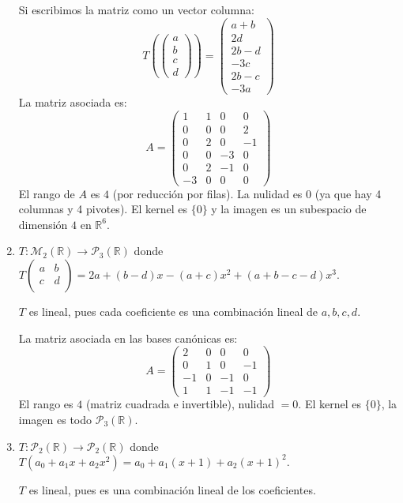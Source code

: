 \begin{prob}
\begin{enumerate}[$a)$]
\begin{myproof}
Si escribimos la matriz como un vector columna:
\[
T\left(\begin{pmatrix}a\\b\\c\\d\end{pmatrix}\right) =
\begin{pmatrix}
a+b \\ 2d \\ 2b-d \\ -3c \\ 2b-c \\ -3a
\end{pmatrix}
\]
La matriz asociada es:
\[
A = \begin{pmatrix}
1 & 1 & 0 & 0 \\
0 & 0 & 0 & 2 \\
0 & 2 & 0 & -1 \\
0 & 0 & -3 & 0 \\
0 & 2 & -1 & 0 \\
-3 & 0 & 0 & 0
\end{pmatrix}
\]
El rango de $A$ es $4$ (por reducción por filas). La nulidad es $0$ (ya que hay 4 columnas y 4 pivotes). El kernel es $\{0\}$ y la imagen es un subespacio de dimensión $4$ en $\mathbb{R}^6$.
\end{myproof}

\item $T:\mathcal{M}_{2}\left(\mathbb{R}\right) \rightarrow \mathcal{P}_{3}(\mathbb{R})$  donde $T\left( \begin{array}{cc} 
	a&b \\
	c&d\\
	\end{array} \right)= 2a+(b-d)x-(a+c)x^2+(a+b-c-d)x^3.$
\begin{myproof}
$T$ es lineal, pues cada coeficiente es una combinación lineal de $a, b, c, d$.

La matriz asociada en las bases canónicas es:
\[
A = \begin{pmatrix}
2 & 0 & 0 & 0 \\
0 & 1 & 0 & -1 \\
-1 & 0 & -1 & 0 \\
1 & 1 & -1 & -1
\end{pmatrix}
\]
El rango es $4$ (matriz cuadrada e invertible), nulidad $=0$. El kernel es $\{0\}$, la imagen es todo $\mathcal{P}_3(\mathbb{R})$.
\end{myproof}

\item $T:\mathcal{P}_{2}(\mathbb{R}) \rightarrow \mathcal{P}_{2}(\mathbb{R})$ donde $T(a_0+a_1x+a_2x^2)= a_0+a_1(x+1)+a_2(x+1)^2.$
\begin{myproof}
$T$ es lineal, pues es una combinación lineal de los coeficientes.


\end{myproof}
\end{enumerate}
\end{prob}
